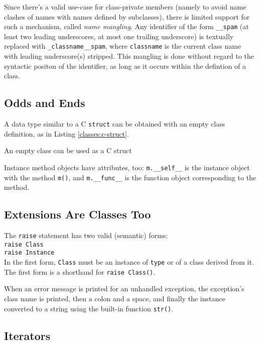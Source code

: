 Since there's a valid use-case for class-private members
(namely to avoid name clashes of names with names defined by subclasses),
there is limited support for such a mechanism, called \emph{name mangling}.
Any identifier of the form \verb=__spam=
(at least two leading underscores, at most one trailing underscore)
is textually replaced with \verb=_classname__spam=,
where \verb=classname= is the current class name
with leading underscore(s) stripped.
This mangling is done
without regard to the syntactic positon of the identifier,
as long as it occurs within the defintion of a class.


\subsection{Odds and Ends}

A data type similar to a C \verb=struct=
can be obtained with an empty class definition,
as in Listing \ref{classes:c-struct}.

\begin{program}
\caption{An empty class can be used as a C struct\label{classes:c-struct}}
\end{program}

Instance method objects have attributes, too:
\verb=m.__self__= is the instance object with the method \verb=m()=,
and \verb=m.__func__= is the function object corresponding to the method.


\subsection{Extensions Are Classes Too}

The \verb=raise= statement has two valid (semantic) forms:\\
\verb=raise Class=\\
\verb=raise Instance=\\
In the first form, \verb=Class= must be an instance of \verb=type=
or of a class derived from it.
The first form is a shorthand for \verb=raise Class()=.

When an error message is printed for an unhandled exception,
the exception's class name is printed, then a colon and a space,
and finally the instance converted to a string
using the built-in function \verb=str()=.


\subsection{Iterators}

